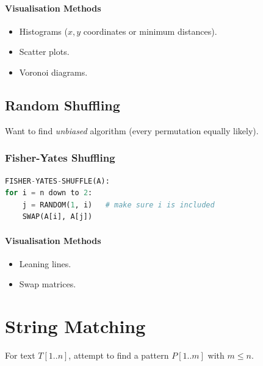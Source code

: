 \documentclass[twocolumn,english]{article}
\numberwithin{equation}{section}
\numberwithin{figure}{section}
\numberwithin{table}{section}
\begin{document}
\paragraph{Visualisation Methods}
\begin{itemize}
\item Histograms ($x,y$ coordinates or minimum distances).
\item Scatter plots.
\item Voronoi diagrams.
\end{itemize}

\subsection{Random Shuffling}

Want to find \emph{unbiased} algorithm (every permutation equally
likely).

\subsubsection*{Fisher-Yates Shuffling}

\begin{lstlisting}[language=Python,basicstyle={\footnotesize\ttfamily},tabsize=4,frame=single]
FISHER-YATES-SHUFFLE(A):
for i = n down to 2:
	j = RANDOM(1, i)   # make sure i is included
	SWAP(A[i], A[j])
\end{lstlisting}

\paragraph{Visualisation Methods}
\begin{itemize}
\item Leaning lines.
\item Swap matrices.
\end{itemize}

\section{String Matching}

For text $T\left[1..n\right]$, attempt to find a pattern $P\left[1..m\right]$
with $m\leq n$.
\end{document}
